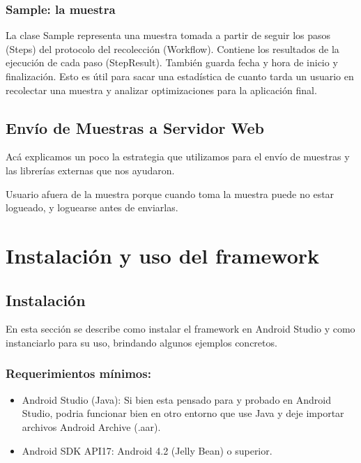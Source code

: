 \subsubsection{Sample: la muestra}
La clase Sample representa una muestra tomada a partir de seguir los pasos (Steps) del protocolo del recolección (Workflow). Contiene los resultados de la ejecución de cada paso (StepResult). También guarda fecha y hora de inicio y finalización. Esto es útil para sacar una estadística de cuanto tarda un usuario en recolectar una muestra y analizar optimizaciones para la aplicación final.

\subsection{Envío de Muestras a Servidor Web}
Acá explicamos un poco la estrategia que utilizamos para el envío de muestras y las librerías externas que nos ayudaron.

Usuario afuera de la muestra porque cuando toma la muestra puede no estar logueado, y loguearse antes de enviarlas.

\section{Instalación y uso del framework}
\subsection{Instalación}
En esta sección se describe como instalar el framework en Android Studio y como instanciarlo para su uso, brindando algunos ejemplos concretos.

\subsubsection{Requerimientos mínimos:}

\begin{itemize}
\item Android Studio (Java): Si bien esta pensado para y probado en Android Studio, podria funcionar bien en otro entorno que use Java y deje importar archivos Android Archive (.aar).
\item Android SDK API17: Android 4.2 (Jelly Bean) o superior.
\end{itemize}

